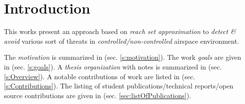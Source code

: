 \cleardoublepage
\chapter{Introduction}\label{ch:introduction}

\noindent This works present an approach based on \emph{reach set approximation} to \emph{detect \& avoid} various sort of threats in \emph{controlled/non-controlled} airspace environment. 

The \emph{motivation} is summarized in (sec. \ref{s:motivation}). The work \emph{goals} are given in (sec. \ref{s:goals}). A \emph{thesis organization} with notes is summarized in (sec. \ref{s:Overview}). A notable contributions of work are listed in (sec. \ref{s:Contributions}). The listing of student publications/technical reports/open source contributions are given in (sec. \ref{sec:listOfPublications}).